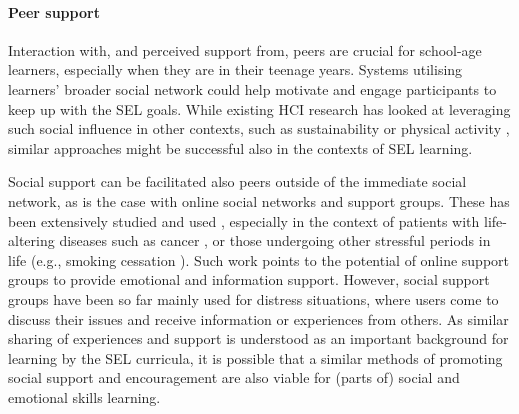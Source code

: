 \documentclass[prodmode,acmtochi]{acmsmall}
\newcommand{\todo}[1]{\textrm{\textrm{\textcolor{LightBlue}{[[#1]]}}}}
\newcommand{\todolater}[1]{}
\begin{document}
\paragraph{Peer support}
Interaction with, and perceived support from, peers are crucial for school-age learners, especially when they are in their teenage years. Systems utilising learners' broader social network could help motivate and engage participants to keep up with the SEL goals. While existing HCI research has looked at leveraging such social influence in other contexts, such as sustainability \cite{Gustafsson2009,Thieme2012a} or physical activity \cite{Lin2006,Gasser2006}, similar approaches might be successful also in the contexts of  SEL learning. 
\todolater{bringing interesting questions around what might be tracked, compared etc.}
%
%
%
Social support can be facilitated also peers outside of the immediate social network, as is the case with online social networks and support groups. These has been extensively studied and used \cite{Barak2008,Newman2011}, especially in the context of patients with life-altering diseases such as cancer \cite{Skeels2010} , or those undergoing other stressful periods in life (e.g., smoking cessation \cite{Ploderer2013}). Such work points to the potential of online support groups to provide emotional and information support.  %
However, social support groups have been so far mainly used for distress situations, where users come to discuss their issues and receive information or experiences from others. As similar sharing of experiences and support is understood as an important background for learning by the SEL curricula, it is possible that a similar methods of promoting social support and encouragement are also viable for (parts of) social and emotional skills learning. %
\end{document}
